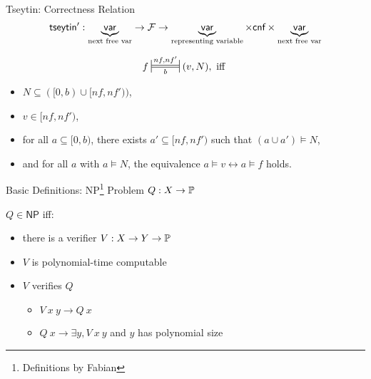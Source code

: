 \documentclass[11pt,usenames,dvipsnames,
hyperref={pdfencoding=auto,psdextra}]{beamer}
\newcommand{\NP}{\textsf{NP}}
\begin{document}
\begin{frame}{Tseytin: Correctness Relation}
  \[ \textsf{tseytin}' : \underbrace{\textsf{var}}_{\text{next free var}} \rightarrow \mathcal{F}{} \rightarrow \underbrace{\textsf{var}}_{\text{representing variable}} \times \textsf{cnf} \times \underbrace{\textsf{var}}_{\text{next free var}} \] 
  
  \[ f \Frepr{nf}{nf'}{b} (v, N), \text{ iff } \]
  \begin{itemize} 
    \item $N \subseteq ([0, b) \cup [nf, nf'))$,
    \item $v \in [nf, nf')$,
    \item for all $a \subseteq [0, b)$, there exists $a' \subseteq [nf, nf')$ such that $(a \cup a') \models N$,
    \item and for all $a$ with $a \models N$, the equivalence $a \models v \leftrightarrow a \models f$ holds.
  \end{itemize}
\end{frame}

\begin{frame}{Basic Definitions: \NP{}\footnote{Definitions by Fabian}}
  Problem $Q : X \rightarrow \mathbb{P}$

  \vspace{2ex}
  $Q \in \NP{}$ iff:
  \begin{itemize}
    \item there is a verifier $V : X \rightarrow Y \rightarrow \mathbb{P}$
    \item $V$ is polynomial-time computable 
    \item $V$ verifies $Q$ 
      \begin{itemize}
        \item $V~x~y \rightarrow Q~x$
        \item $Q~x \rightarrow \exists y, V~x~y$ and $y$ has polynomial size 
      \end{itemize}
  \end{itemize}
\end{frame}
\end{document}
